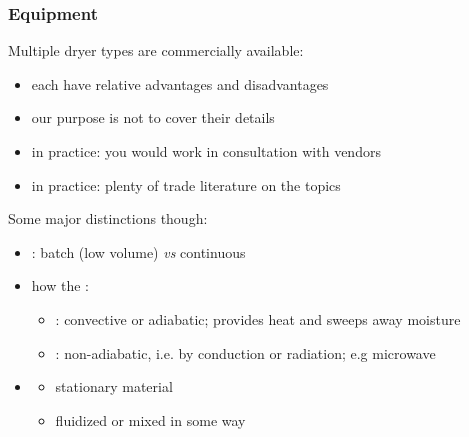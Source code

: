 \begin{frame}\frametitle{Equipment}
	Multiple dryer types are commercially available:
	\begin{itemize}
		\item	each have relative advantages and disadvantages
		\item	our purpose is not to cover their details
		\item	in practice: you would work in consultation with vendors
		\item	in practice: plenty of trade literature on the topics {}
	\end{itemize}
	\vspace{12pt}
	Some major distinctions though:
	\begin{itemize}
		\item	\textbf{{\color{myGreen}{mode of operation}}}: batch (low volume) \emph{vs} continuous
		\item	how the \textbf{{\color{myGreen}{heat is provided}}}:
		\begin{itemize}
			\item	{\color{purple}{direct heat}}: convective or adiabatic; provides heat and sweeps away moisture
			\item	{\color{purple}{indirect heat}}: non-adiabatic, i.e. by conduction or radiation; e.g microwave
		\end{itemize}
		\item	\textbf{{\color{myGreen}{degree of agitation}}}
		\begin{itemize}
			\item	stationary material
			\item	fluidized or mixed in some way
		\end{itemize}
	\end{itemize}
\end{frame}

